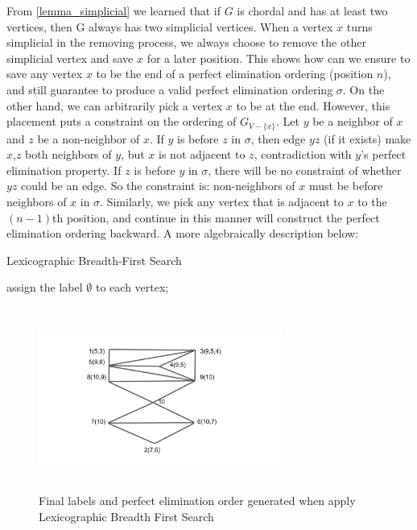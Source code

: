 From \ref{lemma_simplicial} we learned that if $G$ is chordal and has at least two vertices, then G always has two simplicial vertices. 
When a vertex $x$ turns simplicial in the removing process, we always choose to remove the other simplicial vertex and save $x$ for a later position.
This shows how can we ensure to save any vertex $x$ to be the end of a perfect elimination ordering (position $n$), and still guarantee to produce a valid perfect elimination ordering $\sigma$. On the other hand, we can arbitrarily pick a vertex $x$ to be at the end. However, this placement puts a constraint on the ordering of $G_{V-\{x\}}$. Let $y$ be a neighbor of $x$ and $z$ be a non-neighbor of $x$. If $y$ is before $z$ in $\sigma$, then edge $yz$ (if it exists) make $x$,$z$ both neighbors of $y$, but $x$ is not adjacent to $z$, contradiction with $y$'s perfect elimination property. If $z$ is before $y$ in $\sigma$, there will be no constraint of whether $yz$ could be an edge. So the constraint is: non-neighbors of $x$ must be before neighbors of $x$ in $\sigma$. Similarly, we pick any vertex that is adjacent to $x$ to the $(n-1)$th position, and continue in this manner will construct the perfect elimination ordering backward. A more algebraically description below\cite{rose1976algorithmic}:

\begin{algorithm}[H]
\SetAlgoLined

\caption{Lexicographic Breadth-First Search}
\label{lexbfs}
\BlankLine
\Begin
{    
	assign the label $\emptyset$ to each vertex;
    
   
}       
\end{algorithm}

\begin{figure}[H]
\centering
\includegraphics[width=8cm,height=6cm]{figures/lex_illu2}
\caption{Final labels and perfect elimination order generated when apply Lexicographic Breadth First Search}
\label{lex_illu}
\end{figure}

